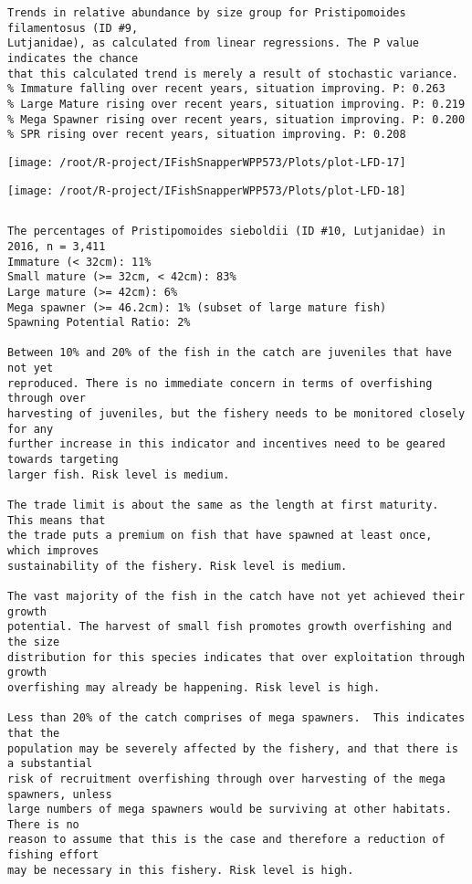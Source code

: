 \documentclass{report}\usepackage[]{graphicx}\usepackage[]{color}
\makeatletter
\def\maxwidth{ %
  \ifdim\Gin@nat@width>\linewidth
    \linewidth
  \else
    \Gin@nat@width
  \fi
}
\newenvironment{kframe}{%
 \def\at@end@of@kframe{}%
 \ifinner\ifhmode%
  \def\at@end@of@kframe{\end{minipage}}%
  \begin{minipage}{\columnwidth}%
 \fi\fi%
 \def\FrameCommand##1{\hskip\@totalleftmargin \hskip-\fboxsep
 \colorbox{shadecolor}{##1}\hskip-\fboxsep
     \hskip-\linewidth \hskip-\@totalleftmargin \hskip\columnwidth}%
 \MakeFramed {\advance\hsize-\width
   \@totalleftmargin\z@ \linewidth\hsize
   \@setminipage}}%
 {\par\unskip\endMakeFramed%
 \at@end@of@kframe}
\newenvironment{knitrout}{}{} %
\makeatother
\begin{document}
\begin{knitrout}
\begin{kframe}
\begin{verbatim}
Trends in relative abundance by size group for Pristipomoides filamentosus (ID #9,
Lutjanidae), as calculated from linear regressions. The P value indicates the chance
that this calculated trend is merely a result of stochastic variance.
% Immature falling over recent years, situation improving. P: 0.263
% Large Mature rising over recent years, situation improving. P: 0.219
% Mega Spawner rising over recent years, situation improving. P: 0.200
% SPR rising over recent years, situation improving. P: 0.208
\end{verbatim}
\end{kframe}
\texttt{[image: /root/R-project/IFishSnapperWPP573/Plots/plot-LFD-17]} 

\texttt{[image: /root/R-project/IFishSnapperWPP573/Plots/plot-LFD-18]} 
\begin{kframe}\begin{verbatim}
\end{verbatim}
\end{kframe}
\clearpage
\newpage
\begin{kframe}\begin{verbatim}The percentages of Pristipomoides sieboldii (ID #10, Lutjanidae) in 2016, n = 3,411
Immature (< 32cm): 11%
Small mature (>= 32cm, < 42cm): 83%
Large mature (>= 42cm): 6%
Mega spawner (>= 46.2cm): 1% (subset of large mature fish)
Spawning Potential Ratio: 2%
 
Between 10% and 20% of the fish in the catch are juveniles that have not yet
reproduced. There is no immediate concern in terms of overfishing through over
harvesting of juveniles, but the fishery needs to be monitored closely for any
further increase in this indicator and incentives need to be geared towards targeting
larger fish. Risk level is medium.

The trade limit is about the same as the length at first maturity.  This means that
the trade puts a premium on fish that have spawned at least once, which improves
sustainability of the fishery. Risk level is medium.

The vast majority of the fish in the catch have not yet achieved their growth
potential. The harvest of small fish promotes growth overfishing and the size
distribution for this species indicates that over exploitation through growth
overfishing may already be happening. Risk level is high.

Less than 20% of the catch comprises of mega spawners.  This indicates that the
population may be severely affected by the fishery, and that there is a substantial
risk of recruitment overfishing through over harvesting of the mega spawners, unless
large numbers of mega spawners would be surviving at other habitats. There is no
reason to assume that this is the case and therefore a reduction of fishing effort
may be necessary in this fishery. Risk level is high.
 

\end{verbatim}
\end{kframe}
\end{knitrout}
\end{document}

